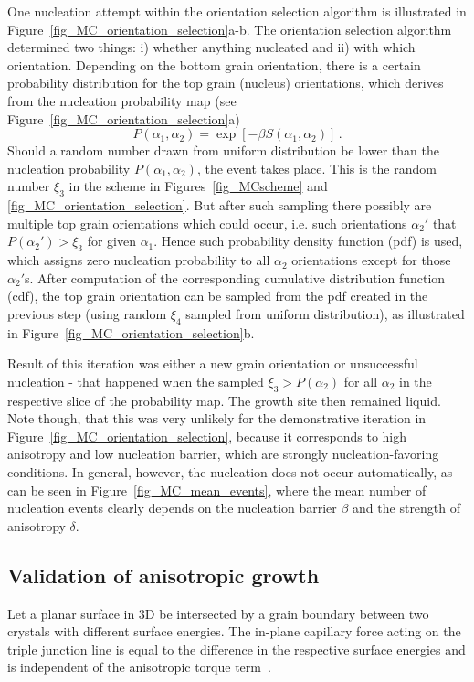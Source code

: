 One nucleation attempt within the orientation selection algorithm is illustrated in Figure~\ref{fig_MC_orientation_selection}a-b. The orientation selection algorithm determined two things: i) whether anything nucleated and ii) with which orientation. Depending on the bottom grain orientation, there is a certain probability distribution for the top grain (nucleus) orientations, which derives from the nucleation probability map (see Figure~\ref{fig_MC_orientation_selection}a)
\begin{equation}
	P(\alpha_1,\alpha_2) = \exp[-\beta S(\alpha_1,\alpha_2)] \,.
\end{equation}
Should a random number drawn from uniform distribution be lower than the nucleation probability $P(\alpha_1,\alpha_2)$, the event takes place. This is the random number $\xi_3$ in the scheme in Figures~\ref{fig_MCscheme} and \ref{fig_MC_orientation_selection}. But after such sampling there possibly are multiple top grain orientations which could occur, i.e. such orientations $\alpha_2'$ that $P(\alpha_2')>\xi_3$ for given $\alpha_1$. Hence such probability density function (pdf) is used, which assigns zero nucleation probability to all $\alpha_2$ orientations except for those $\alpha_2'$s. After computation of the corresponding cumulative distribution function (cdf), the top grain orientation can be sampled from the pdf created in the previous step (using random $\xi_4$ sampled from uniform distribution), as illustrated in Figure~\ref{fig_MC_orientation_selection}b.

Result of this iteration was either a new grain orientation or unsuccessful nucleation - that happened when the sampled $\xi_3>P(\alpha_2)$ for all $\alpha_2$ in the respective slice of the probability map. The growth site then remained liquid. Note though, that this was very unlikely for the demonstrative iteration in Figure~\ref{fig_MC_orientation_selection}, because it corresponds to high anisotropy and low nucleation barrier, which are strongly nucleation-favoring conditions. In general, however, the nucleation does not occur automatically, as can be seen in Figure~\ref{fig_MC_mean_events}, where the mean number of nucleation events clearly depends on the nucleation barrier $\beta$ and the strength of anisotropy $\delta$.

\subsection{Validation of anisotropic growth}
\label{sec_appendix_MC_details}
Let a planar surface in 3D be intersected by a grain boundary between two crystals with different surface energies. The in-plane capillary force acting on the triple junction line is equal to the difference in the respective surface energies and is independent of the anisotropic torque term~\cite{Hoffman1972}.

